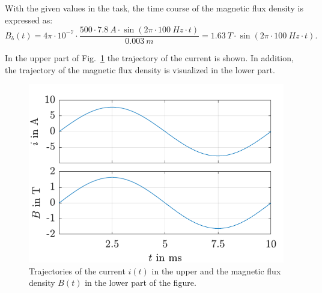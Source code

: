 \begin{solutionblock}
    With the given values in the task, the time course of the magnetic flux density is expressed as:
    \begin{equation}
        B_{\mathrm{\updelta}}(t) = 4 \pi \cdot 10^{-7} \cdot \frac{500 \cdot 7.8 \ \si{A} \cdot \sin(2 \pi \cdot 100 \ \si{Hz} \cdot t)}{0.003 \ \si{m}}
        = 1.63 \ \si{T} \cdot \sin(2 \pi \cdot 100 \ \si{Hz} \cdot t).
    \end{equation}

    In the upper part of Fig.~\ref{fig:solution_FluxDensity} the trajectory of the current is shown. In addition, the trajectory of the magnetic flux density is visualized in the lower part.
    \begin{figure}[ht]
        \centering
        \includegraphics{fig/ex01/solution_FluxDensity.pdf}
        \caption{Trajectories of the current $i(t)$ in the upper and the magnetic flux density $B(t)$ in the lower part of the figure.}
        \label{fig:solution_FluxDensity}
    \end{figure}

\end{solutionblock}





